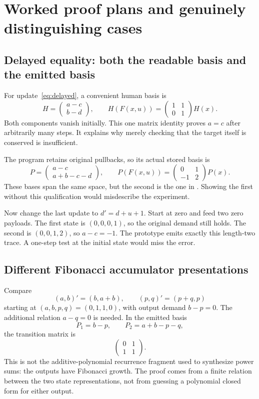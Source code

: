 \section{Worked proof plans and genuinely distinguishing cases}
\label{sec:examples}

\subsection{Delayed equality: both the readable basis and the emitted basis}
For update~\eqref{eq:delayed}, a convenient human basis is
\[
 H=\begin{pmatrix}a-c\\b-d\end{pmatrix},\qquad
 H(F(x,u))=\begin{pmatrix}1&1\\0&1\end{pmatrix}H(x).
\]
Both components vanish initially. This one matrix identity proves $a=c$ after
arbitrarily many steps. It explains why merely checking that the target itself
is conserved is insufficient.

The program retains original pullbacks, so its actual stored basis is
\[
 P=\begin{pmatrix}a-c\\a+b-c-d\end{pmatrix},\qquad
 P(F(x,u))=\begin{pmatrix}0&1\\-1&2\end{pmatrix}P(x).
\]
These bases span the same space, but the second is the one in
. Showing the first without this qualification would
misdescribe the experiment.

Now change the last update to $d'=d+u+1$. Start at zero and feed two zero
payloads. The first state is $(0,0,0,1)$, so the original demand still holds.
The second is $(0,0,1,2)$, so $a-c=-1$. The prototype emits exactly this
length-two trace. A one-step test at the initial state would miss the error.

\subsection{Different Fibonacci accumulator presentations}
Compare
\[
 (a,b)'=(b,a+b),\qquad (p,q)'=(p+q,p)
\]
starting at $(a,b,p,q)=(0,1,1,0)$, with output demand $b-p=0$.
The additional relation $a-q=0$ is needed. In the emitted basis
\[
 P_1=b-p,\qquad P_2=a+b-p-q,
\]
the transition matrix is
\[
 \begin{pmatrix}0&1\\1&1\end{pmatrix}.
\]
This is not the additive-polynomial recurrence fragment used to synthesize
power sums: the outputs have Fibonacci growth. The proof comes from a finite
relation between the two state representations, not from guessing a polynomial
closed form for either output.

